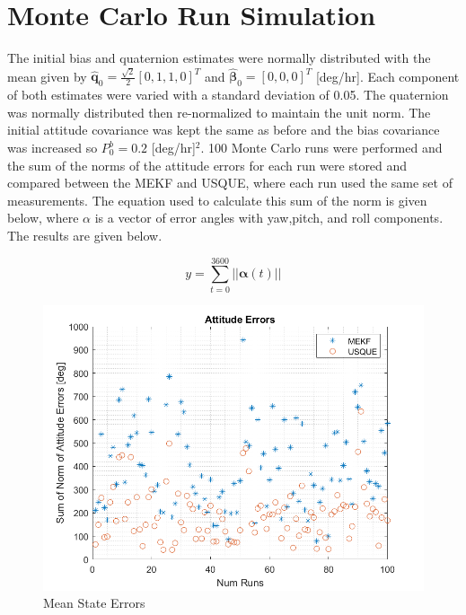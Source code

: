\documentclass[12pt]{report}
\begin{document}
\section*{Monte Carlo Run Simulation }
\noindent The initial bias and quaternion estimates were normally distributed with the mean given by $\pmb{\hat{q}}_0 = \frac{\sqrt{2}}{2}[0, 1, 1, 0]^T$ and $\hat{\pmb{\beta}}_0 = [0, 0, 0]^T$ [deg/hr]. Each component of both estimates were varied with a standard deviation of 0.05. The quaternion was normally distributed then re-normalized to maintain the unit norm. The initial attitude covariance was kept the same as before and the bias covariance was increased so $P_0^b = 0.2$ [deg/hr]$^2$. 100 Monte Carlo runs were performed and the sum of the norms of the attitude errors for each run were stored and compared between the MEKF and USQUE, where each run used the same set of measurements. The equation used to calculate this sum of the norm is given below, where $\alpha$ is a vector of error angles with yaw,pitch, and roll components. The results are given below. 

\begin{equation}
	y = \sum_{t = 0}^{3600}||\pmb{\alpha}(t)||
\end{equation}

\begin{figure}[h!]
	\centering
	\includegraphics[width = .8\textwidth]{attErrMC.png}
	\caption{Mean State Errors}
	\label{fig:Part B}
\end{figure}
\end{document}

